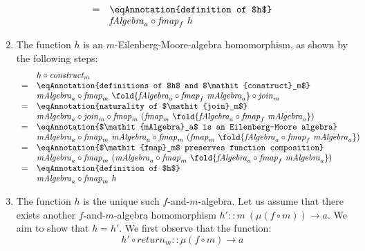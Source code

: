 \begin{proof*}
\begin{enumerate}
\begin{displaymath}
\begin{array}{cl}
        =&\eqAnnotation{definition of $h$} \\
         & \mathit{fAlgebra}_a \circ \mathit{fmap}_f~h
      \end{array}
    \end{displaymath}
  \item The function $h$ is an $m$-Eilenberg-Moore-algebra
    homomorphism, as shown by the following steps:
    \begin{displaymath}
      \begin{array}{cl}
        & h \circ \mathit{construct_m} \\
        =&\eqAnnotation{definitions of $h$ and $\mathit{construct}_m$} \\
         &\mathit{mAlgebra}_a \circ \mathit{fmap}_m~\fold{\mathit{fAlgebra}_a \circ \mathit{fmap}_f~\mathit{mAlgebra}_a} \circ \mathit{join}_m \\
        =&\eqAnnotation{naturality of $\mathit{join}_m$} \\
         &\mathit{mAlgebra}_a \circ \mathit{join}_m \circ \mathit{fmap}_m~(\mathit{fmap}_m~\fold{\mathit{fAlgebra}_a \circ \mathit{fmap}_f~\mathit{mAlgebra}_a}) \\
        =&\eqAnnotation{$\mathit{mAlgebra}_a$ is an Eilenberg-Moore algebra} \\
         &\mathit{mAlgebra}_a \circ \mathit{fmap}_m~\mathit{mAlgebra}_a \circ \mathit{fmap}_m~(\mathit{fmap}_m~\fold{\mathit{fAlgebra}_a \circ \mathit{fmap}_f~\mathit{mAlgebra}_a}) \\
        =&\eqAnnotation{$\mathit{fmap}_m$ preserves function composition} \\
         &\mathit{mAlgebra}_a \circ \mathit{fmap}_m~(\mathit{mAlgebra}_a \circ \mathit{fmap}_m~\fold{\mathit{fAlgebra}_a \circ \mathit{fmap}_f~\mathit{mAlgebra}_a}) \\
        =&\eqAnnotation{definition of $h$} \\
         &\mathit{mAlgebra}_a \circ \mathit{fmap}_m~h
      \end{array}
    \end{displaymath}
  \item The function $h$ is the unique such $f$-and-$m$-algebra. Let
    us assume that there exists another $f$-and-$m$-algebra
    homomorphism $h' :: m~(\mu(f \circ m)) \to a$. We aim to show that
    $h = h'$. We first observe that the function:
    \begin{displaymath}
      h' \circ \mathit{return}_m :: \mu(f \circ m) \to a
    \end{displaymath}

\end{enumerate}
\end{proof*}
